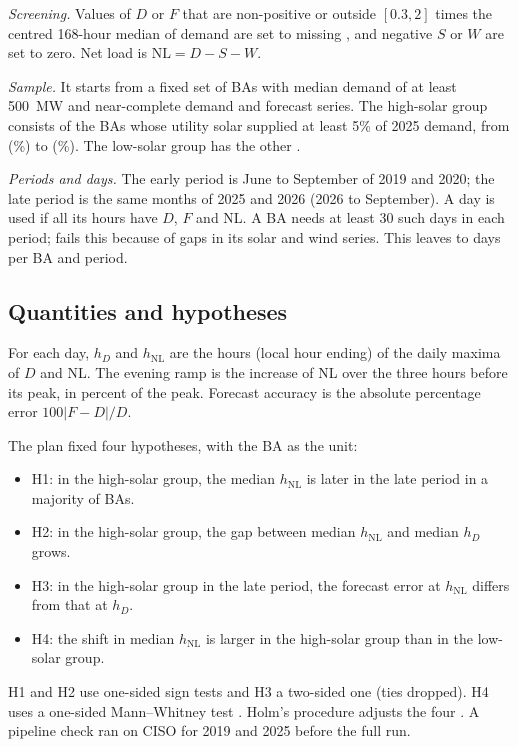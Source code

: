 \documentclass[conference,a4paper]{IEEEtran}
\begin{document}
\emph{Screening.} Values of $D$ or $F$ that are non-positive or outside $[0.3,2]$ times the centred 168-hour median of demand are set to missing \cite{ruggles2020eia}, and negative $S$ or $W$ are set to zero. Net load is $\mathrm{NL}=D-S-W$.

\emph{Sample.} It starts from a fixed set of  BAs with median demand of at least 500~MW and near-complete demand and forecast series. The high-solar group consists of the  BAs whose utility solar supplied at least 5\% of 2025 demand, from  (\%) to  (\%). The low-solar group has the other .

\emph{Periods and days.} The early period is June to September of 2019 and 2020; the late period is the same months of 2025 and 2026 (2026 to September). A day is used if all its hours have $D$, $F$ and NL. A BA needs at least 30 such days in each period;  fails this because of gaps in its solar and wind series. This leaves  to  days per BA and period.

\subsection{Quantities and hypotheses}
For each day, $h_D$ and $h_{\mathrm{NL}}$ are the hours (local hour ending) of the daily maxima of $D$ and NL. The evening ramp is the increase of NL over the three hours before its peak, in percent of the peak. Forecast accuracy is the absolute percentage error $100|F-D|/D$.

The plan fixed four hypotheses, with the BA as the unit:
\begin{itemize}
\item H1: in the high-solar group, the median $h_{\mathrm{NL}}$ is later in the late period in a majority of BAs.
\item H2: in the high-solar group, the gap between median $h_{\mathrm{NL}}$ and median $h_D$ grows.
\item H3: in the high-solar group in the late period, the forecast error at $h_{\mathrm{NL}}$ differs from that at $h_D$.
\item H4: the shift in median $h_{\mathrm{NL}}$ is larger in the high-solar group than in the low-solar group.
\end{itemize}
H1 and H2 use one-sided sign tests and H3 a two-sided one (ties dropped). H4 uses a one-sided Mann--Whitney test \cite{mann1947test}. Holm's procedure adjusts the four \cite{holm1979simple}. A pipeline check ran on CISO for 2019 and 2025 before the full run.
\end{document}

